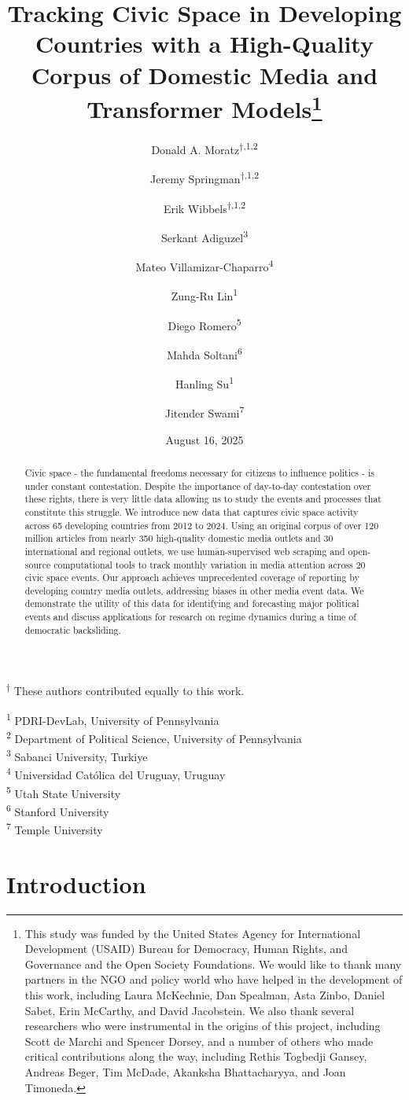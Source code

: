 \documentclass[
  letterpaper,
  DIV=11,
  numbers=noendperiod]{scrartcl}
\title{Tracking Civic Space in Developing Countries with a High-Quality
Corpus of Domestic Media and Transformer Models\thanks{This study was
funded by the United States Agency for International Development (USAID)
Bureau for Democracy, Human Rights, and Governance and the Open Society
Foundations. We would like to thank many partners in the NGO and policy
world who have helped in the development of this work, including Laura
McKechnie, Dan Spealman, Asta Zinbo, Daniel Sabet, Erin McCarthy, and
David Jacobstein. We also thank several researchers who were
instrumental in the origins of this project, including Scott de Marchi
and Spencer Dorsey, and a number of others who made critical
contributions along the way, including Rethis Togbedji Gansey, Andreas
Beger, Tim McDade, Akanksha Bhattacharyya, and Joan Timoneda.}}
\author{Donald A. Moratz\textsuperscript{$\dagger{}$,1,2} \and Jeremy
Springman\textsuperscript{$\dagger{}$,1,2} \and Erik
Wibbels\textsuperscript{$\dagger{}$,1,2} \and Serkant
Adiguzel\textsuperscript{3} \and Mateo
Villamizar-Chaparro\textsuperscript{4} \and Zung-Ru
Lin\textsuperscript{1} \and Diego Romero\textsuperscript{5} \and Mahda
Soltani\textsuperscript{6} \and Hanling
Su\textsuperscript{1} \and Jitender Swami\textsuperscript{7}}
\date{August 16, 2025}
\begin{document}
\maketitle
\begin{abstract}
Civic space - the fundamental freedoms necessary for citizens to
influence politics - is under constant contestation. Despite the
importance of day-to-day contestation over these rights, there is very
little data allowing us to study the events and processes that
constitute this struggle. We introduce new data that captures civic
space activity across 65 developing countries from 2012 to 2024. Using
an original corpus of over 120 million articles from nearly 350
high-quality domestic media outlets and 30 international and regional
outlets, we use human-supervised web scraping and open-source
computational tools to track monthly variation in media attention across
20 civic space events. Our approach achieves unprecedented coverage of
reporting by developing country media outlets, addressing biases in
other media event data. We demonstrate the utility of this data for
identifying and forecasting major political events and discuss
applications for research on regime dynamics during a time of democratic
backsliding.
\end{abstract}
\ifdefined\Shaded\renewenvironment{Shaded}{\begin{tcolorbox}[borderline west={3pt}{0pt}{shadecolor}, interior hidden, boxrule=0pt, breakable, sharp corners, frame hidden, enhanced]}{\end{tcolorbox}}\fi

\textsuperscript{$\dagger{}$}
These authors contributed equally to this work.

\textsuperscript{1} PDRI-DevLab, University of Pennsylvania\\
\textsuperscript{2} Department of Political Science, University of
Pennsylvania\\
\textsuperscript{3} Sabanci University, Turkiye\\
\textsuperscript{4} Universidad Católica del Uruguay, Uruguay\\
\textsuperscript{5} Utah State University\\
\textsuperscript{6} Stanford University\\
\textsuperscript{7} Temple University

\newpage{}

\hypertarget{introduction}{%
\section{Introduction}\label{introduction}}
\end{document}
